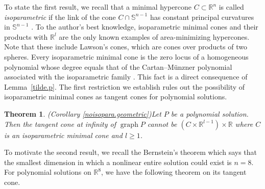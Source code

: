 \documentclass[pdflatex,sn-mathphys-num]{sn-jnl}%
\theoremstyle{thmstyleone}%
\newtheorem{theorem}{Theorem}[section]%
\theoremstyle{thmstyletwo}%
\theoremstyle{thmstylethree}%
\newcommand{\R}{\mathbb{R}}
\newcommand{\SSS}{\mathbb{S}}
\DeclareMathOperator{\graph}{graph}
\begin{document}
\label{isopara}

To state the first result, we recall that a minimal hypercone $C\subset\R^n$ is called \textit{isoparametric} if the link of the cone $C\cap \SSS^{n-1}$ has constant principal curvatures in $\SSS^{n-1}$ \cite{Car0}. 
To the author's best knowledge, isoparametric minimal cones and their products with $\R^l$ are the only known examples of area-minimizing hypercones. Note that these include Lawson's cones, which are cones over products of two spheres. Every isoparametric minimal cone is the zero locus of a homogeneous polynomial whose degree equals that of the Cartan–Münzner polynomial associated with the isoparametric family \cite{Car,Mu1,Mu2}. This fact is a direct consequence of Lemma~\ref{tilde.p}. The first restriction we establish rules out the possibility of isoparametric minimal cones as tangent cones for polynomial solutions.
\begin{theorem}
    (Corollary \ref{noisopara.geometric})\label{noisopara0}
	Let $P$ be a polynomial solution. Then the tangent cone at infinity of $\graph P$ cannot be $(C\times\R^{l-1})\times \R$ where $C$ is an isoparametric minimal cone and $l\ge 1$.
\end{theorem}


To motivate the second result, we recall the Bernstein's theorem which says that the smallest dimension in which a nonlinear entire solution could exist is $n=8$. For polynomial solutions on $\R^8$, we have the following theorem on its tangent cone.
\end{document}
